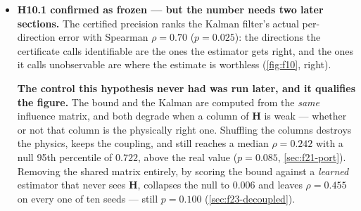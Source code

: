 \begin{itemize}
  \item \textbf{H10.1 confirmed as frozen --- but the number needs two later sections.} The
    certified precision ranks the Kalman filter's actual per-direction error with Spearman
    $\rho = 0.70$ ($p = 0.025$): the directions the certificate calls identifiable are the
    ones the estimator gets right, and the ones it calls unobservable are where the estimate
    is worthless (\cref{fig:f10}, right).

    \textbf{The control this hypothesis never had was run later, and it qualifies the
    figure.} The bound and the Kalman are computed from the \emph{same} influence matrix, and
    both degrade when a column of $\mathbf{H}$ is weak --- whether or not that column is the
    physically right one. Shuffling the columns destroys the physics, keeps the coupling, and
    still reaches a median $\rho = 0.242$ with a null 95th percentile of $0.722$, above the
    real value ($p = 0.085$, \cref{sec:f21-port}). Removing the shared matrix entirely, by
    scoring the bound against a \emph{learned} estimator that never sees $\mathbf{H}$,
    collapses the null to $0.006$ and leaves $\rho = 0.455$ on every one of ten seeds ---
    still $p = 0.100$ (\cref{sec:f23-decoupled}).


\end{itemize}
